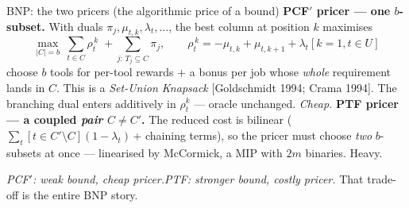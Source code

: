 \documentclass[10pt]{beamer}
\newcommand{\U}{U}\newcommand{\Kst}{K^{\ast}}\newcommand{\Zst}{Z^{\ast}}
\newcommand{\good}[1]{\textcolor{tight}{#1}}
\newcommand{\bad}[1]{\textcolor{acc}{#1}}
\begin{document}
\begin{frame}{BNP: the two pricers (the algorithmic price of a bound)}
\textbf{PCF$'$ pricer --- one $b$-subset.} With duals $\pi_j,\mu_{t,k},\lambda_t,\dots$,
the best column at position $k$ maximises
\[
  \max_{|C|=b}\ \sum_{t\in C}\rho_t^{\,k}\;+\!\!\sum_{j:\,T_j\subseteq C}\!\!\pi_j ,
  \qquad \rho_t^{\,k}=-\mu_{t,k}+\mu_{t,k+1}+\lambda_t[k{=}1,t\in\U]
\]
choose $b$ tools for per-tool rewards $+$ a bonus per job whose \emph{whole} requirement
lands in $C$. This is a \emph{Set-Union Knapsack} {\footnotesize[Goldschmidt 1994; Crama 1994]}.
The branching dual enters \good{additively} in $\rho_t^k$ --- oracle unchanged. \emph{Cheap.}
\vspace{1mm}
\textbf{PTF pricer --- a coupled \emph{pair} $C\ne C'$.} The reduced cost is bilinear
($\sum_t[t\in C'\!\setminus\!C](1-\lambda_t)\,$+ chaining terms), so the pricer must
choose \emph{two} $b$-subsets at once --- linearised by McCormick, a MIP with $2m$
binaries. \bad{Heavy.}
\begin{center}\small
\emph{PCF$'$: weak bound, cheap pricer.\qquad PTF: stronger bound, costly pricer.} \;
That trade-off is the entire BNP story.
\end{center}
\end{frame}
\end{document}
